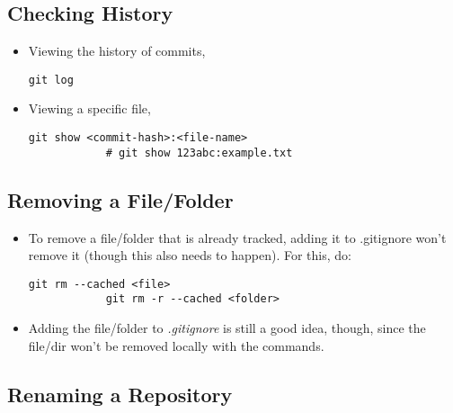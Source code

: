 \documentclass[12pt, a4paper]{article}
\numberwithin{equation}{section}
\theoremstyle{definition}
\theoremstyle{definition}
\begin{document}
	\subsection{Checking History}
	\begin{itemize}
		\item Viewing the history of commits,
		
		\begin{lstlisting}[style=mystylebash, label=alg:history1, xleftmargin=\parindent]
			git log
		\end{lstlisting}
	
		\item Viewing a specific file,
		\begin{lstlisting}[style=mystylebash, label=alg:history1, xleftmargin=\parindent]
			git show <commit-hash>:<file-name>
			# git show 123abc:example.txt
		\end{lstlisting}
	\end{itemize}
	
	\subsection{Removing a File/Folder}
	
	\begin{itemize}
		\item To remove a file/folder that is already tracked, adding it to .gitignore won’t remove it (though this also needs to happen). For this, do:
		
		\begin{lstlisting}[style=mystylebash, label=alg:git_remove, xleftmargin=\parindent]
			git rm --cached <file>
			git rm -r --cached <folder>
		\end{lstlisting}

		\item Adding the file/folder to \textit{.gitignore} is still a good idea, though, since the file/dir won’t be removed locally with the commands.
	\end{itemize}
	
	\subsection{Renaming a Repository}
	
\end{document}
